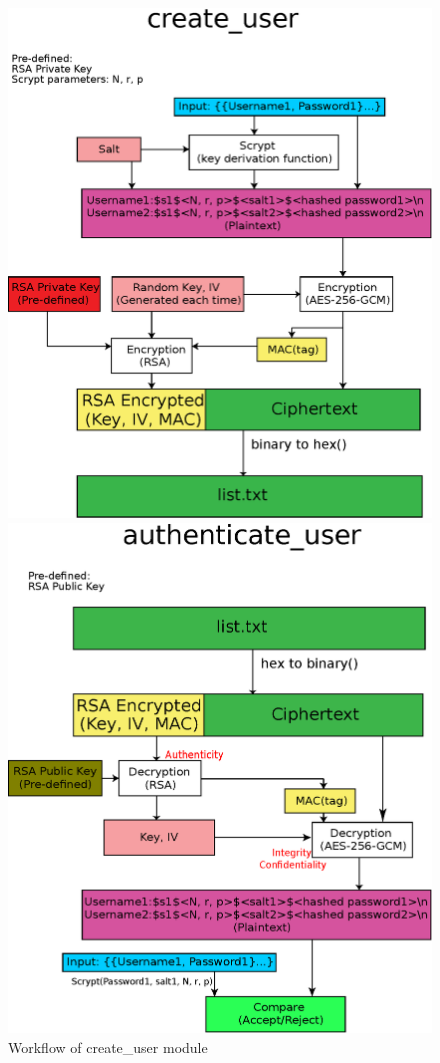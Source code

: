 \documentclass[journal]{IEEEtran}
\begin{document}
\begin{figure}[h]
\centering
\begin{minipage}{0.45\textwidth}
\centering
\includegraphics[width=\linewidth]{create.eps} 
\caption{Workflow of create\_user module}
\end{minipage}\hfill
\begin{minipage}{0.45\textwidth}
\centering
\includegraphics[width=\linewidth]{authenticate.eps}

\end{minipage}
\end{figure}
\end{document}
